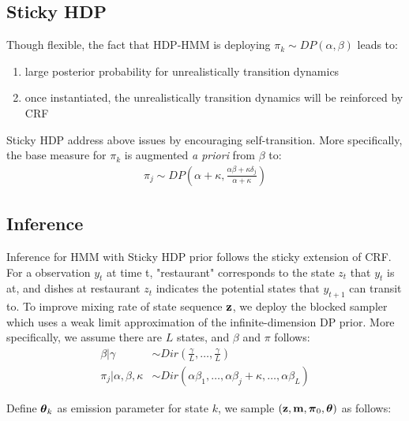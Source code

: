 \documentclass{article} %
\begin{document}
\subsection{Sticky HDP}
Though flexible, the fact that HDP-HMM is deploying $\pi_k \sim DP(\alpha, \beta)$ leads to:
\begin{enumerate}
\item large posterior probability for unrealistically transition dynamics
\item once instantiated, the unrealistically transition dynamics will be reinforced by CRF
\end{enumerate}
Sticky HDP address above issues by encouraging self-transition. More specifically, the base measure for $\pi_k$ is augmented \textit{a priori} from $\beta$ to:
\begin{align*}
\pi_j \sim
DP(\alpha + \kappa, \frac{\alpha\beta + \kappa \delta_j}{\alpha + \kappa})
\end{align*}

\subsection{Inference }
Inference for HMM with Sticky HDP prior follows the sticky extension of CRF. For a observation $y_t$ at time t, "restaurant" corresponds to the state $z_t$ that $y_t$ is at, and dishes at restaurant $z_t$ indicates the potential states that $y_{t+1}$ can transit to. To improve mixing rate of state sequence ${\bf z}$, we deploy the blocked sampler which uses a weak limit approximation of the infinite-dimension DP prior. More specifically, we assume there are $L$ states, and $\beta$ and $\pi$ follows:
\begin{align*}
\beta | \gamma & \sim Dir(\frac{\gamma}{L}, \dots, \frac{\gamma}{L}) \\
\pi_j | \alpha, \beta, \kappa & \sim
Dir(\alpha \beta_1, \dots, \alpha \beta_j + \kappa, \dots, \alpha \beta_L)
\end{align*}

Define $\boldsymbol{\theta}_k$ as emission parameter for state $k$, we sample $({\bf z}, {\bf m}, \boldsymbol{\pi}_0, \boldsymbol{\theta})$ as follows:
\end{document}
